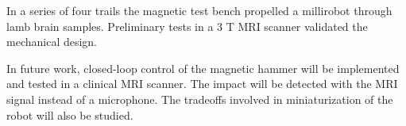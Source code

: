 \documentclass[letterpaper, 10 pt, conference]{ieeeconf}  %
\begin{document}
	In a series of four trails the magnetic test bench propelled a millirobot through lamb brain samples. Preliminary tests in a 3 T MRI scanner validated the mechanical design.\par
In future work, closed-loop control of the magnetic hammer will be implemented and tested in a clinical MRI scanner. 
The impact will be detected with the MRI signal instead of a microphone. 
The tradeoffs involved in miniaturization of the robot will also be studied.

 

\addtolength{\textheight}{-12cm}   %







\end{document}
